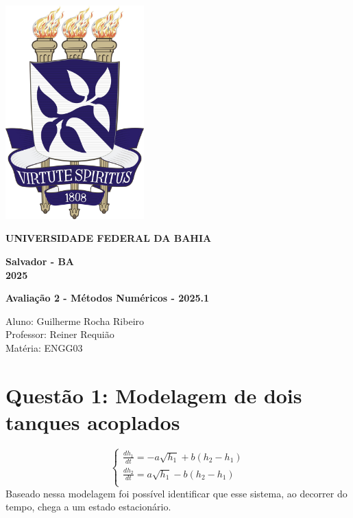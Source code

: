 \documentclass{article}
\begin{document}
\begin{titlepage}
    \centering
    
    \includegraphics[width=0.4\textwidth]{brasao_ufba.jpg} \\
    \vspace{1cm}
    
    \textbf{\large UNIVERSIDADE FEDERAL DA BAHIA} \\
    \vspace{12cm}
    
    \textbf{\large Salvador - BA} \\
    \textbf{\large 2025}
\end{titlepage}




\begin{center}
\large\textbf{Avaliação 2 - Métodos Numéricos - 2025.1} \\
\end{center}

\begin{flushleft}
Aluno: Guilherme Rocha Ribeiro \\
Professor: Reiner Requião \\
Matéria: ENGG03
\end{flushleft}

\section*{Questão 1: Modelagem de dois tanques acoplados}
\justifying
\begin{equation}\label{eq:sistema}
\begin{cases}
\frac{dh_1}{dt} = -a\sqrt{h_1} + b(h_2 - h_1) \\
\frac{dh_2}{dt} = a\sqrt{h_1} - b(h_2 - h_1) \\
\end{cases}
\end{equation}
Baseado nessa modelagem foi possível identificar que esse sistema, ao decorrer do tempo, chega a um estado estacionário.
\end{document}
